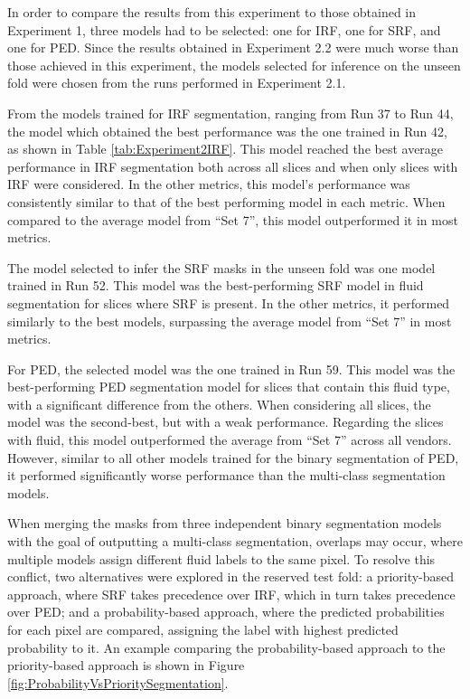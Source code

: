 In order to compare the results from this experiment to those obtained in Experiment 1, three models had to be selected: one for IRF, one for SRF, and one for PED. Since the results obtained in Experiment 2.2 were much worse than those achieved in this experiment, the models selected for inference on the unseen fold were chosen from the runs performed in Experiment 2.1.
\par
From the models trained for IRF segmentation, ranging from Run 37 to Run 44, the model which obtained the best performance was the one trained in Run 42, as shown in Table \ref{tab:Experiment2IRF}. This model reached the best average performance in IRF segmentation both across all slices and when only slices with IRF were considered. In the other metrics, this model's performance was consistently similar to that of the best performing model in each metric. When compared to the average model from ``Set 7'', this model outperformed it in most metrics.
\par
The model selected to infer the SRF masks in the unseen fold was one model trained in Run 52. This model was the best-performing SRF model in fluid segmentation for slices where SRF is present. In the other metrics, it performed similarly to the best models, surpassing the average model from ``Set 7'' in most metrics.
\par
For PED, the selected model was the one trained in Run 59. This model was the best-performing PED segmentation model for slices that contain this fluid type, with a significant difference from the others. When considering all slices, the model was the second-best, but with a weak performance. Regarding the slices with fluid, this model outperformed the average from ``Set 7'' across all vendors. However, similar to all other models trained for the binary segmentation of PED, it performed significantly worse performance than the multi-class segmentation models.
\par
When merging the masks from three independent binary segmentation models with the goal of outputting a multi-class segmentation, overlaps may occur, where multiple models assign different fluid labels to the same pixel. To resolve this conflict, two alternatives were explored in the reserved test fold: a priority-based approach, where SRF takes precedence over IRF, which in turn takes precedence over PED; and a probability-based approach, where the predicted probabilities for each pixel are compared, assigning the label with highest predicted probability to it. An example comparing the probability-based approach to the priority-based approach is shown in Figure \ref{fig:ProbabilityVsPrioritySegmentation}.

